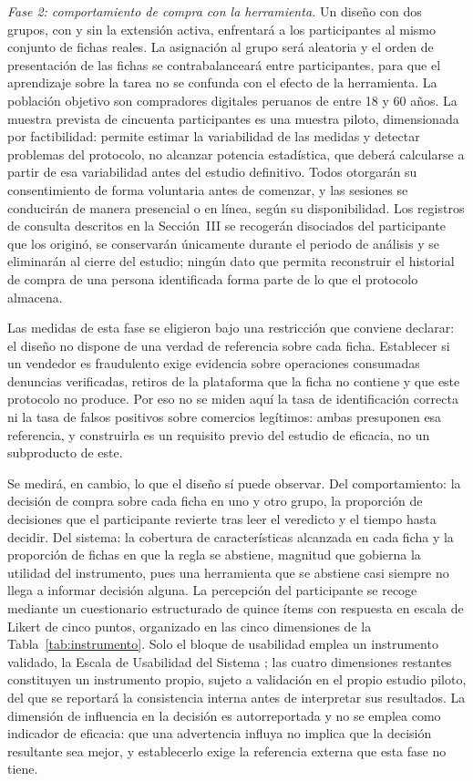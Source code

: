 \emph{Fase 2: comportamiento de compra con la herramienta.} Un diseño con dos grupos, con y
sin la extensión activa, enfrentará a los participantes al mismo conjunto de fichas reales. La
asignación al grupo será aleatoria y el orden de presentación de las fichas se
contrabalanceará entre participantes, para que el aprendizaje sobre la tarea no se confunda
con el efecto de la herramienta. La población objetivo son compradores digitales peruanos de
entre 18 y 60 años. La muestra prevista de cincuenta participantes es una muestra piloto,
dimensionada por factibilidad: permite estimar la variabilidad de las medidas y detectar
problemas del protocolo, no alcanzar potencia estadística, que deberá calcularse a partir de
esa variabilidad antes del estudio definitivo. Todos otorgarán su consentimiento de forma
voluntaria antes de comenzar, y las sesiones se conducirán de manera presencial o en línea,
según su disponibilidad. Los registros de consulta descritos en la Sección~III se recogerán
disociados del participante que los originó, se conservarán únicamente durante el periodo de
análisis y se eliminarán al cierre del estudio; ningún dato que permita reconstruir el
historial de compra de una persona identificada forma parte de lo que el protocolo almacena.

Las medidas de esta fase se eligieron bajo una restricción que conviene declarar: el diseño no
dispone de una verdad de referencia sobre cada ficha. Establecer si un vendedor es fraudulento
exige evidencia sobre operaciones consumadas denuncias verificadas, retiros de la plataforma
que la ficha no contiene y que este protocolo no produce. Por eso no se miden aquí la tasa de
identificación correcta ni la tasa de falsos positivos sobre comercios legítimos: ambas
presuponen esa referencia, y construirla es un requisito previo del estudio de eficacia, no un
subproducto de este.

Se medirá, en cambio, lo que el diseño sí puede observar. Del comportamiento: la decisión de
compra sobre cada ficha en uno y otro grupo, la proporción de decisiones que el participante
revierte tras leer el veredicto y el tiempo hasta decidir. Del sistema: la cobertura de
características alcanzada en cada ficha y la proporción de fichas en que la regla se abstiene,
magnitud que gobierna la utilidad del instrumento, pues una herramienta que se abstiene casi
siempre no llega a informar decisión alguna. La percepción del participante se recoge mediante
un cuestionario estructurado de quince ítems con respuesta en escala de Likert de cinco
puntos, organizado en las cinco dimensiones de la Tabla~\ref{tab:instrumento}. Solo el bloque
de usabilidad emplea un instrumento validado, la Escala de Usabilidad del Sistema
\cite{ref23}; las cuatro dimensiones restantes constituyen un instrumento propio, sujeto a
validación en el propio estudio piloto, del que se reportará la consistencia interna antes de
interpretar sus resultados. La dimensión de influencia en la decisión es autorreportada y no
se emplea como indicador de eficacia: que una advertencia influya no implica que la decisión
resultante sea mejor, y establecerlo exige la referencia externa que esta fase no tiene.

